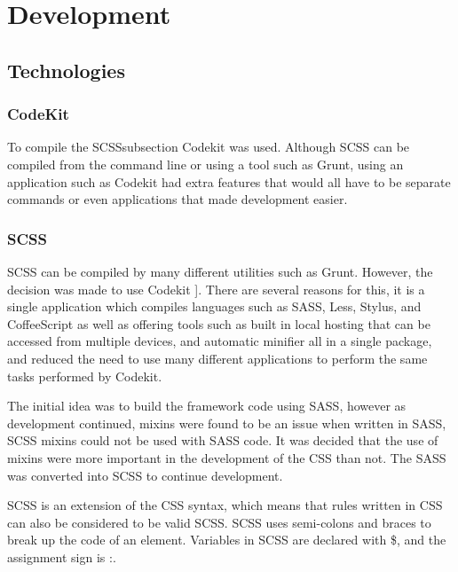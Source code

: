 \chapter*{Development}
\section*{Technologies}

\subsection*{CodeKit}

To compile the \gls{SCSS}subsection Codekit \citep{CODEKIT17} was used. Although \gls{SCSS} can be compiled from the command line or using a tool such as Grunt, using an application such as Codekit had extra features that would all have to be separate commands or even applications that made development easier. 

\subsection*{SCSS}

\gls{SCSS} can be compiled by many different utilities such as Grunt. However, the decision was made to use Codekit \citep{CODEKIT17}]. There are several reasons for this, it is a single application which compiles languages such as SASS, Less, Stylus, and CoffeeScript as well as offering tools such as built in local hosting that can be accessed from multiple devices, and automatic minifier all in a single package, and reduced the need to use many different applications to perform the same tasks performed by Codekit.
 
 The initial idea was to build the framework code using \gls{SASS}, however as development continued, \gls{mixins} were found to be an issue when written in \gls{SASS}, \gls{SCSS} \gls{mixins} could not be used with \gls{SASS} code. It was decided that the use of \gls{mixins} were more important in the development of the \gls{CSS} than not. The \gls{SASS} was converted into \gls{SCSS} to continue development. 
 
\gls{SCSS} is an extension of the \gls{CSS} syntax, which means that rules written in \gls{CSS} can also be considered to be valid \gls{SCSS}. \gls{SCSS} uses semi-colons and braces to break up the code of an element. Variables in \gls{SCSS} are declared with \$, and the assignment sign is :. 


